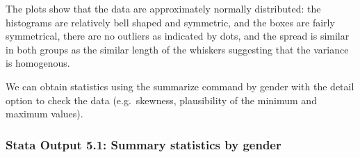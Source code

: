 \documentclass[
]{memoir}
\begin{document}
The plots show that the data are approximately normally distributed: the histograms are relatively bell shaped and symmetric, and the boxes are fairly symmetrical, there are no outliers as indicated by dots, and the spread is similar in both groups as the similar length of the whiskers suggesting that the variance is homogenous.

We can obtain statistics using the summarize command by gender with the detail option to check the data (e.g.~skewness, plausibility of the minimum and maximum values).

\hypertarget{stata-output-5.1-summary-statistics-by-gender}{%
\subsubsection*{Stata Output 5.1: Summary statistics by gender}\label{stata-output-5.1-summary-statistics-by-gender}}
\end{document}
